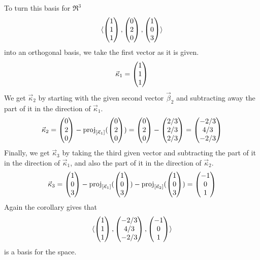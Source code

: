 \begin{example} \label{ex:OrthoBasisForReThree}
To turn this basis for \( \Re^3 \)
\begin{equation*}
  \sequence{
           \colvec{1 \\ 1 \\ 1},
           \colvec{0 \\ 2 \\ 0},
           \colvec{1 \\ 0 \\ 3}
            }
\end{equation*}
into an orthogonal basis, we take the first vector as it is given.
\begin{equation*}
   \vec{\kappa}_1=\colvec{1 \\ 1 \\ 1}
\end{equation*}
We get \( \vec{\kappa}_2 \) by starting with the given second vector 
$\vec{\beta}_2$ and
subtracting away the part of it in the direction of \( \vec{\kappa}_1 \).
\begin{equation*}
   \vec{\kappa}_2=\colvec{0 \\ 2 \\ 0}
                   -\proj{\colvec{0 \\ 2 \\ 0}}{\spanof{\vec{\kappa}_1}}
                 =\colvec{0 \\ 2 \\ 0}-\colvec{2/3 \\ 2/3 \\ 2/3}
                 =\colvec{-2/3 \\ 4/3 \\ -2/3}
\end{equation*}
Finally, we get $\vec{\kappa}_3$  
by taking the third given vector and subtracting the part of it
in the direction of \( \vec{\kappa}_1 \), and also the part 
of it in the direction of \( \vec{\kappa}_2 \).
\begin{equation*}
   \vec{\kappa}_3=\colvec{1 \\ 0 \\ 3}
                   -\proj{\colvec{1 \\ 0 \\ 3}}{\spanof{\vec{\kappa}_1}}
                   -\proj{\colvec{1 \\ 0 \\ 3}}{\spanof{\vec{\kappa}_2}}
                 =\colvec{-1 \\ 0 \\ 1}
\end{equation*}
Again the corollary gives that 
\begin{equation*}
  \sequence{
           \colvec{1 \\ 1 \\ 1},
           \colvec{-2/3 \\ 4/3 \\ -2/3},
           \colvec{-1 \\ 0 \\ 1}
           }
\end{equation*}
is a basis for the space.
\end{example}

